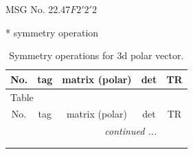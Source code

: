 \documentclass[fleqn,8pt]{jsarticle}
\begin{document}
\setcounter{MaxMatrixCols}{32}

\renewcommand{\tablename}{Table~}
\renewcommand{\figurename}{Figure~}
\begin{center}
\LARGE
MSG No. 22.47\quad$F2'2'2$
\end{center}
* symmetry operation
\renewcommand{\arraystretch}{1.3}
\begin{longtable}{ccccc}
\caption{Symmetry operations for 3d polar vector.}
 \\
 \hline \hline
No. & tag & matrix (polar) & det & TR \\ \hline \endfirsthead

\multicolumn{4}{l}{\tablename\ \thetable{}} \\
 \hline \hline
No. & tag & matrix (polar) & det & TR \\ \hline \endhead

 \hline \hline
\multicolumn{4}{r}{\footnotesize\it continued ...} \\ \endfoot

 \hline \hline
\multicolumn{4}{r}{} \\ \endlastfoot


\end{longtable}
\end{document}
